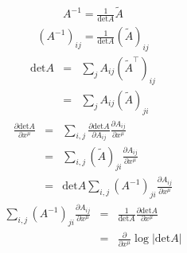 \documentclass[12pt]{ujarticle}
\begin{document}
\begin{eqnarray}
A^{-1} = \frac{1}{\mathrm{det}A}\tilde{A}
\end{eqnarray}
\begin{eqnarray}
\left(A^{-1}\right)_{ij} = \frac{1}{\mathrm{det}A}\left(\tilde{A}\right)_{ij}
\end{eqnarray}
\begin{eqnarray}
\mathrm{det}A &=& \sum_{j}A_{ij}\left(\tilde{A}^\top\right)_{ij} \\
&=& \sum_{j}A_{ij}\left(\tilde{A}\right)_{ji}
\end{eqnarray}
\begin{eqnarray}
\frac{\partial \mathrm{det}A}{\partial x^{\mu}} &=& \sum_{i,j}\frac{\partial\mathrm{det}A}{\partial A_{ij}}\frac{\partial A_{ij}}{\partial x^{\mu}} \\
&=& \sum_{i,j}\left(\tilde{A}\right)_{ji}\frac{\partial A_{ij}}{\partial x^{\mu}} \\
&=& \mathrm{det}A\sum_{i,j}\left(A^{-1}\right)_{ji}\frac{\partial A_{ij}}{\partial x^{\mu}}
\end{eqnarray}
\begin{eqnarray}
\sum_{i,j}\left(A^{-1}\right)_{ji}\frac{\partial A_{ij}}{\partial x^{\mu}} &=& \frac{1}{\mathrm{det}A}\frac{\partial\mathrm{det}A}{\partial x^{\mu}} \\
&=& \frac{\partial}{\partial x^{\mu}}\log\left|\mathrm{det}A\right|
\end{eqnarray}
\end{document}
